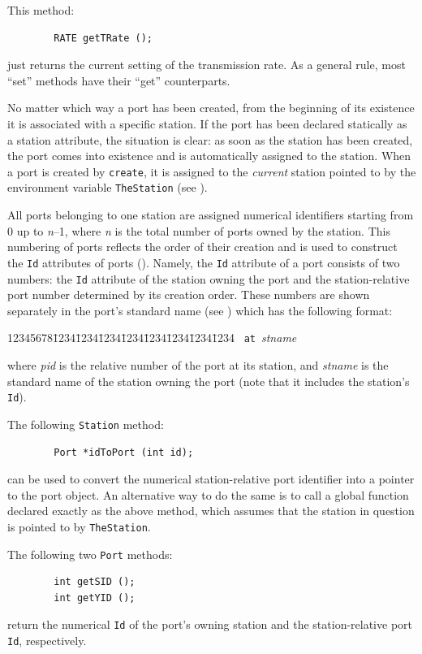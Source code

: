This method:
\begin{verbatim}
        RATE getTRate ();
\end{verbatim}
\noindent
just returns the current setting of the transmission rate.
As a general rule, most ``set'' methods have their ``get'' counterparts.

\medskip

No matter which way a port has been created,
from the beginning of its existence it is associated with a specific station.
If the port has been declared statically
as a station attribute, the situation is clear:
as soon as the station has been created, the port comes into existence and
is automatically assigned to the station.
When a port is created by {\tt create}, it is assigned to
the {\em current\/} station pointed to by the environment
variable {\tt TheStation} (see ).

All ports belonging to one station are assigned numerical identifiers starting
from 0 up to {\em n\/}--1, where {\em n\/} is the total number of ports owned by the
station.
This numbering of ports reflects the order of their
creation and is used to construct the
{\tt Id} attributes of ports ().
Namely, the {\tt Id} attribute of a port consists of two numbers: the {\tt Id}
attribute of the station owning the port and the station-relative port
number determined by its creation order.
These numbers are shown separately in the port's standard name
(see ) which has the following format:
{\tt\begin{tabbing}
12345678\=1234\=1234\=1234\=1234\=1234\=1234\=1234\=1234\kill
{}~{\tt at}~{\em stname}
\end{tabbing}}
\noindent
where {\em pid\/} is the relative number of the port at its station, and
{\em stname\/} is the standard name of the station owning the port (note that
it includes the station's {\tt Id}).

The following {\tt Station} method:
\begin{verbatim}
        Port *idToPort (int id);
\end{verbatim}
can be used to convert the numerical station-relative port identifier into
a pointer to the port object.
An alternative way to do the same is to call a global function declared
exactly as the above method, which assumes that the station in question is
pointed to by {\tt TheStation}.

The following two {\tt Port} methods:
\begin{verbatim}
        int getSID ();
        int getYID ();
\end{verbatim}
return the numerical {\tt Id} of the port's owning station and the
station-relative port {\tt Id}, respectively.

